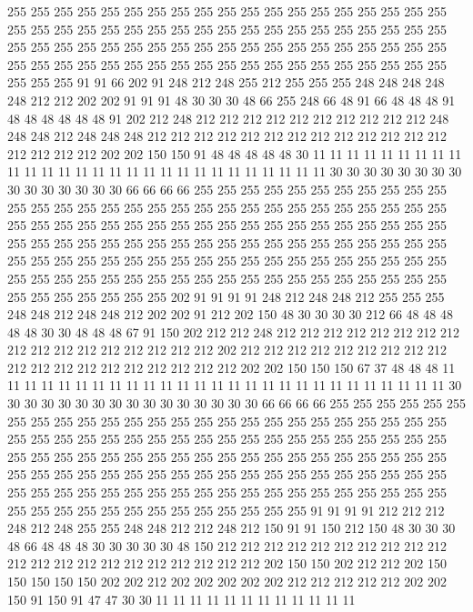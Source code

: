 255 255 255 255 255 255 255 255 255 255 255 255 255 255 255 255 255 255 255 255
255 255 255 255 255 255 255 255 255 255 255 255 255 255 255 255 255 255 255 255
255 255 255 255 255 255 255 255 255 255 255 255 255 255 255 255 255 255 255 255
255 255 255 255 255 255 255 255 255 255 255 255 255 255 255 255 255 255 255 91
91 66 202 91 248 212 248 255 212 255 255 255 248 248 248 248 248 212 212 202
202 91 91 91 48 30 30 30 48 66 255 248 66 48 91 66 48 48 48 91
48 48 48 48 48 48 91 202 212 248 212 212 212 212 212 212 212 212 212 212
248 248 248 212 248 248 248 212 212 212 212 212 212 212 212 212 212 212 212 212
212 212 212 212 202 202 150 150 91 48 48 48 48 48 30 11 11 11 11 11
11 11 11 11 11 11 11 11 11 11 11 11 11 11 11 11 11 11 11 11
11 11 11 30 30 30 30 30 30 30 30 30 30 30 30 30 30 30 66 66
66 66 255 255 255 255 255 255 255 255 255 255 255 255 255 255 255 255 255 255
255 255 255 255 255 255 255 255 255 255 255 255 255 255 255 255 255 255 255 255
255 255 255 255 255 255 255 255 255 255 255 255 255 255 255 255 255 255 255 255
255 255 255 255 255 255 255 255 255 255 255 255 255 255 255 255 255 255 255 255
255 255 255 255 255 255 255 255 255 255 255 255 255 255 255 255 255 255 255 255
255 255 255 255 255 255 255 255 255 255 255 255 255 255 255 202 91 91 91 91
248 212 248 248 212 255 255 255 248 248 212 248 248 212 202 202 91 212 202 150
48 30 30 30 30 212 66 48 48 48 48 48 30 30 48 48 48 67 91 150
202 212 212 248 212 212 212 212 212 212 212 212 212 212 212 212 212 212 212 212
212 202 212 212 212 212 212 212 212 212 212 212 212 212 212 212 212 212 212 212
212 202 202 150 150 150 67 37 48 48 48 11 11 11 11 11 11 11 11 11
11 11 11 11 11 11 11 11 11 11 11 11 11 11 11 11 11 11 30 30
30 30 30 30 30 30 30 30 30 30 30 30 30 30 66 66 66 66 255 255
255 255 255 255 255 255 255 255 255 255 255 255 255 255 255 255 255 255 255 255
255 255 255 255 255 255 255 255 255 255 255 255 255 255 255 255 255 255 255 255
255 255 255 255 255 255 255 255 255 255 255 255 255 255 255 255 255 255 255 255
255 255 255 255 255 255 255 255 255 255 255 255 255 255 255 255 255 255 255 255
255 255 255 255 255 255 255 255 255 255 255 255 255 255 255 255 255 255 255 255
255 255 255 255 255 255 255 255 255 255 255 255 91 91 91 91 212 212 212 248
212 248 255 255 248 248 212 212 248 212 150 91 91 150 212 150 48 30 30 30
48 66 48 48 48 30 30 30 30 30 48 150 212 212 212 212 212 212 212 212
212 212 212 212 212 212 212 212 212 212 212 212 212 202 150 150 202 212 212 202
150 150 150 150 150 202 202 212 202 202 202 202 202 212 212 212 212 212 202 202
150 91 150 91 47 47 30 30 11 11 11 11 11 11 11 11 11 11 11 11
